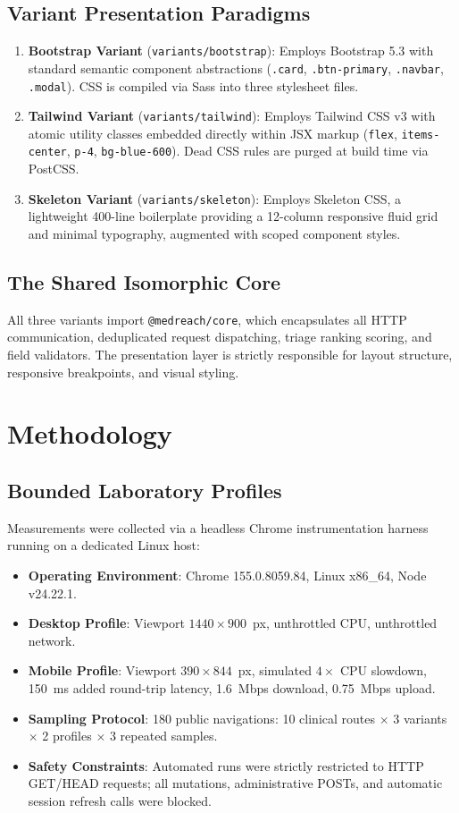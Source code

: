 \documentclass[conference]{IEEEtran}
\begin{document}
\subsection{Variant Presentation Paradigms}
\begin{enumerate}
    \item \textbf{Bootstrap Variant} (\texttt{variants/bootstrap}): Employs Bootstrap 5.3 with standard semantic component abstractions (\texttt{.card}, \texttt{.btn-primary}, \texttt{.navbar}, \texttt{.modal}). CSS is compiled via Sass into three stylesheet files.
    \item \textbf{Tailwind Variant} (\texttt{variants/tailwind}): Employs Tailwind CSS v3 with atomic utility classes embedded directly within JSX markup (\texttt{flex}, \texttt{items-center}, \texttt{p-4}, \texttt{bg-blue-600}). Dead CSS rules are purged at build time via PostCSS.
    \item \textbf{Skeleton Variant} (\texttt{variants/skeleton}): Employs Skeleton CSS, a lightweight 400-line boilerplate providing a 12-column responsive fluid grid and minimal typography, augmented with scoped component styles.
\end{enumerate}

\subsection{The Shared Isomorphic Core}
All three variants import \texttt{@medreach/core}, which encapsulates all HTTP communication, deduplicated request dispatching, triage ranking scoring, and field validators. The presentation layer is strictly responsible for layout structure, responsive breakpoints, and visual styling.

\section{Methodology}

\subsection{Bounded Laboratory Profiles}
Measurements were collected via a headless Chrome instrumentation harness running on a dedicated Linux host:
\begin{itemize}
    \item \textbf{Operating Environment}: Chrome 155.0.8059.84, Linux x86\_64, Node v24.22.1.
    \item \textbf{Desktop Profile}: Viewport $1440\times 900$~px, unthrottled CPU, unthrottled network.
    \item \textbf{Mobile Profile}: Viewport $390\times 844$~px, simulated $4\times$ CPU slowdown, 150~ms added round-trip latency, 1.6~Mbps download, 0.75~Mbps upload.
    \item \textbf{Sampling Protocol}: 180 public navigations: 10 clinical routes $\times$ 3 variants $\times$ 2 profiles $\times$ 3 repeated samples.
    \item \textbf{Safety Constraints}: Automated runs were strictly restricted to HTTP GET/HEAD requests; all mutations, administrative POSTs, and automatic session refresh calls were blocked.
\end{itemize}
\end{document}
